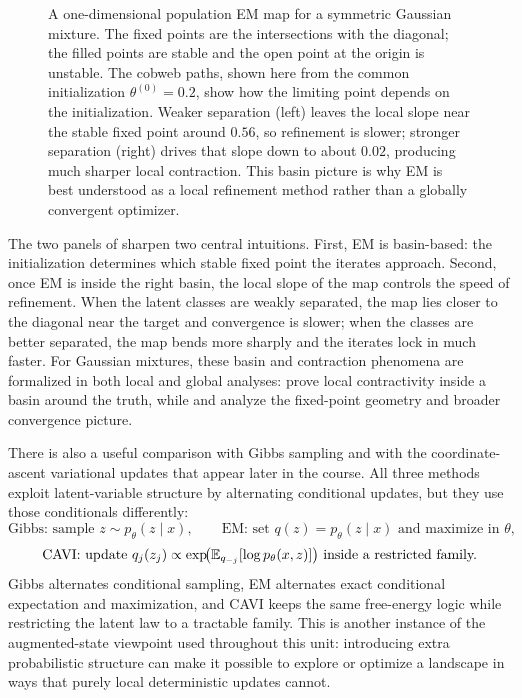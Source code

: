 \begin{figure}[t]
  \centering
  
  \caption{A one-dimensional population EM map for a symmetric Gaussian mixture.
  The fixed points are the intersections with the diagonal; the filled points are stable and the open point at the origin is unstable.
  The cobweb paths, shown here from the common initialization $\theta^{(0)}=0.2$, show how the limiting point depends on the initialization.
  Weaker separation (left) leaves the local slope near the stable fixed point around $0.56$, so refinement is slower; stronger separation (right) drives that slope down to about $0.02$, producing much sharper local contraction.
  This basin picture is why EM is best understood as a local refinement method rather than a globally convergent optimizer.}
  \label{fig:em-operator-fixed-points}
\end{figure}

The two panels of  sharpen two central intuitions.
First, EM is basin-based: the initialization determines which stable fixed point the iterates approach.
Second, once EM is inside the right basin, the local slope of the map controls the speed of refinement.
When the latent classes are weakly separated, the map lies closer to the diagonal near the target and convergence is slower; when the classes are better separated, the map bends more sharply and the iterates lock in much faster.
For Gaussian mixtures, these basin and contraction phenomena are formalized in both local and global analyses: \citet[Cor.~1--2]{balakrishnan_wainwright_yu_2014_em} prove local contractivity inside a basin around the truth, while \citet[Thm.~1]{daskalakis_tzamos_zampetakis_2016_ten_steps_em} and \citet[Thms.~3--4]{xu_hsu_maleki_2016_global_em} analyze the fixed-point geometry and broader convergence picture.

There is also a useful comparison with Gibbs sampling and with the coordinate-ascent variational updates that appear later in the course.
All three methods exploit latent-variable structure by alternating conditional updates, but they use those conditionals differently:
\[
  \text{Gibbs: sample } z \sim p_\theta(z\mid x), \qquad
  \text{EM: set } q(z)=p_\theta(z\mid x) \text{ and maximize in } \theta,
\]
\[
  \text{CAVI: update } q_j(z_j) \propto \exp\!\bigl(\mathbb{E}_{q_{-j}}[\log p_\theta(x,z)]\bigr)
  \text{ inside a restricted family.}
\]
Gibbs alternates conditional sampling, EM alternates exact conditional expectation and maximization, and CAVI keeps the same free-energy logic while restricting the latent law to a tractable family.
This is another instance of the augmented-state viewpoint used throughout this unit: introducing extra probabilistic structure can make it possible to explore or optimize a landscape in ways that purely local deterministic updates cannot.

